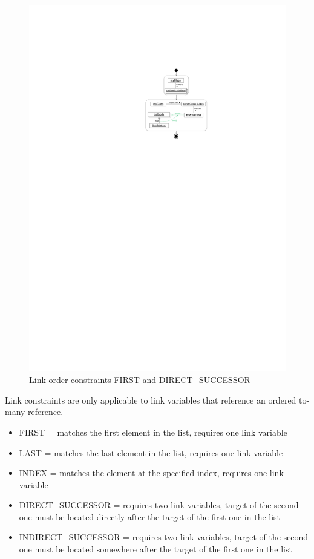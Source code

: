 
\begin{figure}[p]
  \centering
  \includegraphics[scale=.8]{figures/LinkConstraints1}
  \caption{Link order constraints FIRST and DIRECT\_SUCCESSOR}
  \label{fig:linkConstraints}
\end{figure}

Link constraints are only applicable to link variables that reference an ordered to-many reference. 
\begin{itemize}
  \item FIRST = matches the first element in the list, requires one link variable
  \item LAST = matches the last element in the list, requires one link variable
  \item INDEX = matches the element at the specified index, requires one link variable
  \item DIRECT\_SUCCESSOR = requires two link variables, target of the second one must be located directly after the target of the first one in the list
  \item INDIRECT\_SUCCESSOR = requires two link variables, target of the second one must be located somewhere after the target of the first one in the list
\end{itemize}

